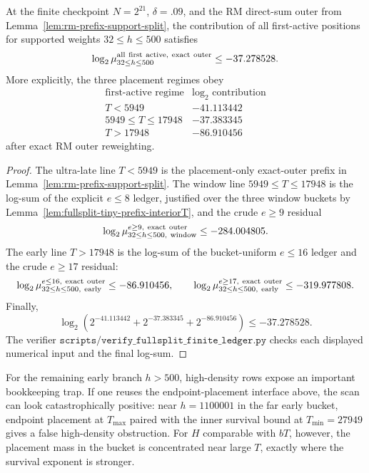 \begin{corollary}
\label{cor:fullsplit-small-prefix-all-first-active}
At the finite checkpoint \(N=2^{21}\), \(\delta=.09\), and the RM direct-sum outer from
Lemma~\ref{lem:rm-prefix-support-split}, the contribution of all first-active positions for supported weights
\(32\le h\le500\) satisfies
\[
\log_2\mu_{32\le h\le500}^{\rm all\ first\ active,\ exact\ outer}\le -37.278528.
\]
More explicitly, the three placement regimes obey
\[
\begin{array}{c|c}
\text{first-active regime} & \log_2\text{ contribution}\\
\hline
T<5949 & -41.113442\\
5949\le T\le17948 & -37.383345\\
T>17948 & -86.910456
\end{array}
\]
after exact RM outer reweighting.
\end{corollary}

\begin{proof}
The ultra-late line \(T<5949\) is the placement-only exact-outer prefix in
Lemma~\ref{lem:rm-prefix-support-split}.  The window line \(5949\le T\le17948\) is the log-sum of the explicit
\(e\le8\) ledger, justified over the three window buckets by
Lemma~\ref{lem:fullsplit-tiny-prefix-interiorT}, and the crude \(e\ge9\) residual
\[
\log_2\mu_{32\le h\le500,\ {\rm window}}^{e\ge9,\ {\rm exact\ outer}}\le -284.004805.
\]
The early line \(T>17948\) is the log-sum of the bucket-uniform \(e\le16\) ledger and the crude \(e\ge17\) residual:
\[
\log_2\mu_{32\le h\le500,\ {\rm early}}^{e\le16,\ {\rm exact\ outer}}\le -86.910456,
\qquad
\log_2\mu_{32\le h\le500,\ {\rm early}}^{e\ge17,\ {\rm exact\ outer}}\le -319.977808.
\]
Finally,
\[
\log_2\!\left(2^{-41.113442}+2^{-37.383345}+2^{-86.910456}\right)\le -37.278528.
\]
The verifier \(\texttt{scripts/verify\_fullsplit\_finite\_ledger.py}\) checks each displayed numerical input and the
final log-sum.
\end{proof}

For the remaining early branch \(h>500\), high-density rows expose an important bookkeeping trap.  If one reuses the
endpoint-placement interface above, the scan can look catastrophically positive: near \(h=1100001\) in the far early
bucket, endpoint placement at \(T_{\max}\) paired with the inner survival bound at \(T_{\min}=27949\) gives a false
high-density obstruction.  For \(H\) comparable with \(bT\), however, the placement mass in the bucket is concentrated
near large \(T\), exactly where the survival exponent is stronger.

